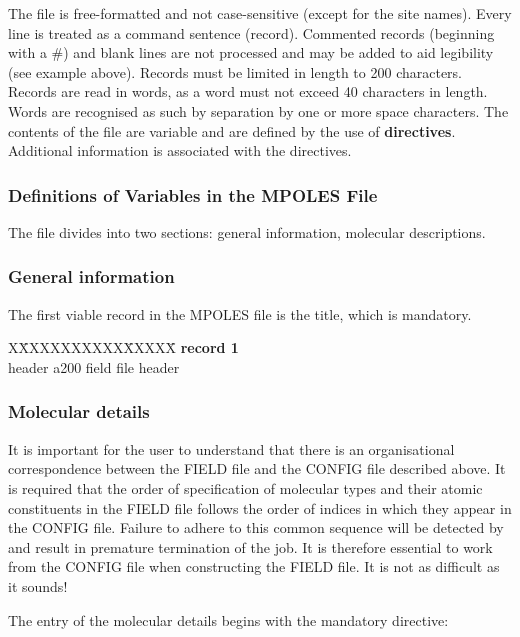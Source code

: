 The file is free-formatted and not case-sensitive (except for the site names).
Every line is treated as a command sentence (record).  Commented records
(beginning with a \#) and blank lines are not processed and may be
added to aid legibility (see example above).  Records must be
limited in length to 200 characters.  Records are read in words,
as a word must not exceed 40 characters in length.  Words are
recognised as such by separation by one or more space characters.
The contents of the file are variable and are defined by the use
of {\bf directives}.  Additional information is associated with
the directives.

\subsubsection{Definitions of Variables in the MPOLES File}

The file divides into two sections: general information, molecular
descriptions.

\subsubsection*{General information}

The first viable record in the MPOLES file is the title, which is mandatory.
\begin{tabbing}
X\=XXXXXXXXXX\=XXXXX\=\kill
{\bf record 1} \\
\> header      \> a200 \> field file header
\end{tabbing}

\subsubsection*{Molecular details}

It is important for the user to understand that there is an
organisational correspondence between the FIELD file and the
CONFIG file described above.  It is required that the order of
specification of molecular types and their atomic constituents in
the FIELD file follows the order of indices in which they appear
in the CONFIG file.  Failure to adhere to this common sequence
will be detected by \D and result in premature termination of the
job. It is therefore essential to work from the CONFIG file when
constructing the FIELD file.  It is not as difficult as it sounds!

The entry of the molecular details begins with the mandatory
directive:

